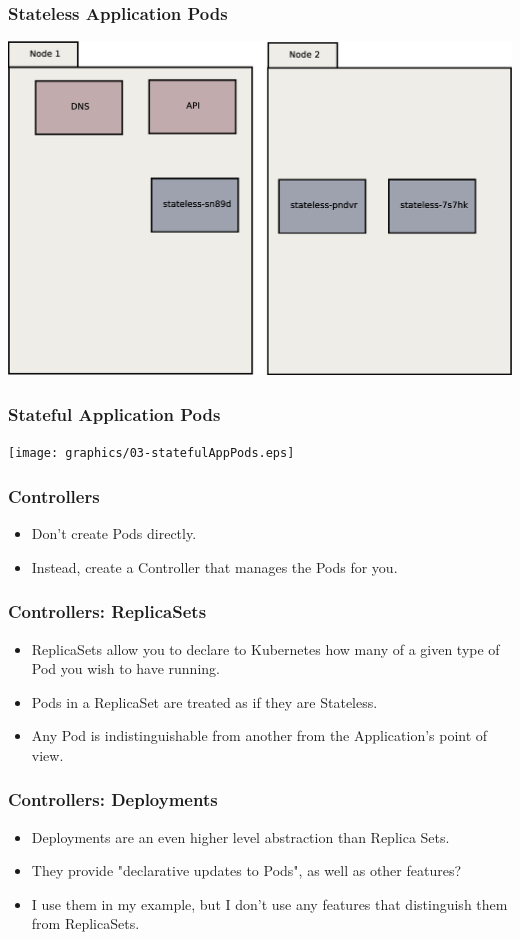 \documentclass{beamer}
\begin{document}
\begin{frame}
    \frametitle{Stateless Application Pods}
    \includegraphics[width=\textwidth,height=0.85\textheight,keepaspectratio]{graphics/02-statelessAppPods.eps}
\end{frame}

\begin{frame}
    \frametitle{Stateful Application Pods}
    \texttt{[image: graphics/03-statefulAppPods.eps]}
\end{frame}

\begin{frame}
    \frametitle{Controllers}
    \begin{itemize}
        \item Don't create Pods directly.
        \item Instead, create a Controller that manages the Pods for you.
    \end{itemize}
\end{frame}

\begin{frame}
    \frametitle{Controllers: ReplicaSets}
    \begin{itemize}
        \item ReplicaSets allow you to declare to Kubernetes how many of a given type of Pod you wish to have running.
        \item Pods in a ReplicaSet are treated as if they are Stateless.
        \item Any Pod is indistinguishable from another from the Application's point of view.
    \end{itemize}
\end{frame}

\begin{frame}
    \frametitle{Controllers: Deployments}
    \begin{itemize}
        \item Deployments are an even higher level abstraction than Replica Sets.
        \item They provide "declarative updates to Pods", as well as other features?
        \item I use them in my example, but I don't use any features that distinguish them from ReplicaSets.
    \end{itemize}
\end{frame}
\end{document}
